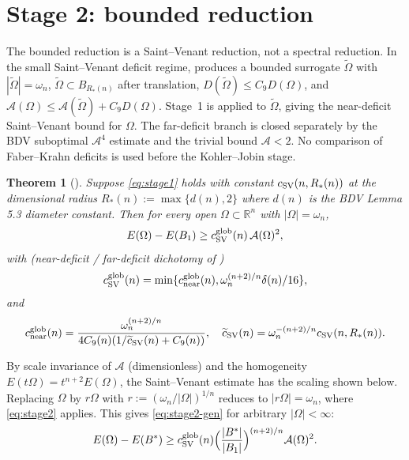 \documentclass[11pt]{article}
\newtheorem{theorem}{Theorem}[section]
\theoremstyle{definition}
\newcommand{\R}{\mathbb{R}}
\newcommand{\Fr}{\mathcal{A}}
\newcommand{\Om}{\Omega}
\newcommand{\Bstar}{B^{*}}
\begin{document}
\section{Stage 2: bounded reduction}\label{sec:stage2}

The bounded reduction is a Saint--Venant reduction, not a spectral
reduction.  In the small Saint--Venant deficit regime,
\cite[Lemma~5.3]{BDV-BoundedReduction-Plan1} produces a bounded
surrogate $\widetilde\Om$ with $|\widetilde\Om|=\omega_n$,
$\widetilde\Om\subset B_{R_*(n)}$ after translation,
$D(\widetilde\Om)\le C_9D(\Om)$, and
$\Fr(\Om)\le \Fr(\widetilde\Om)+C_9D(\Om)$. Stage~1 is applied to
$\widetilde\Om$, giving the near-deficit Saint--Venant bound for
$\Om$. The far-deficit branch is closed separately by the BDV
suboptimal $\Fr^4$ estimate and the trivial bound $\Fr<2$. No
comparison of Faber--Krahn deficits is used before the
Kohler--Jobin stage.

\begin{theorem}[{\cite[Thm.~5.1]{BDV-BoundedReduction-Plan1}}]\label{thm:stage2}
Suppose \eqref{eq:stage1} holds with constant $c_{\rm SV}(n,R_*(n))$
at the dimensional radius $R_*(n):=\max\{d(n),2\}$ where $d(n)$ is the
BDV Lemma 5.3 diameter constant. Then for every open $\Om\subset\R^n$
with $|\Om|=\omega_n$,
\begin{equation}\label{eq:stage2}
   E(\Om)-E(B_1)\ge c_{\rm SV}^{\rm glob}(n)\,\Fr(\Om)^2,
\end{equation}
with (near-deficit / far-deficit dichotomy of
\cite[Lemma~5.2]{BDV-BoundedReduction-Plan1})
\begin{equation}\label{eq:csv-glob}
   c_{\rm SV}^{\rm glob}(n)=\min\{c_{\rm near}^{\rm glob}(n),\omega_n^{(n+2)/n}\delta(n)/16\},
\end{equation}
and
\[
   c_{\rm near}^{\rm glob}(n)=\frac{\omega_n^{(n+2)/n}}{4C_9(n)(1/\widetilde c_{\rm SV}(n)+C_9(n))},
   \quad \widetilde c_{\rm SV}(n)=\omega_n^{-(n+2)/n}c_{\rm SV}(n,R_*(n)).
\]
\end{theorem}

By scale invariance of $\Fr$ (dimensionless) and the homogeneity
$E(t\Om)=t^{n+2}E(\Om)$, the Saint--Venant estimate has the scaling
shown below.
Replacing $\Om$ by $r\Om$ with $r:=(\omega_n/|\Om|)^{1/n}$ reduces to
$|r\Om|=\omega_n$, where \eqref{eq:stage2} applies. This gives
\eqref{eq:stage2-gen} for arbitrary $|\Om|<\infty$:
\begin{equation}\label{eq:stage2-gen}
   E(\Om)-E(\Bstar)\ge c_{\rm SV}^{\rm glob}(n)\Bigl(\frac{|\Bstar|}{|B_1|}\Bigr)^{(n+2)/n}\Fr(\Om)^2.
\end{equation}
\end{document}
